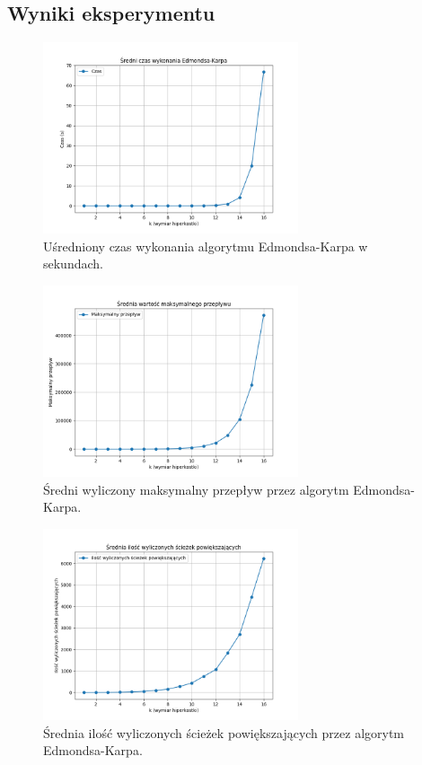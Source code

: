 \documentclass{article}
\begin{document}
\subsection{Wyniki eksperymentu}
\begin{figure}[H]
\centering
\includegraphics[width=0.67\textwidth]{edmondsKarpTimePlot.png}
\caption{Uśredniony czas wykonania algorytmu Edmondsa-Karpa w sekundach.}
\end{figure}

\begin{figure}[H]
\centering
\includegraphics[width=0.67\textwidth]{edmondsKarpFlowPlot.png}
\caption{Średni wyliczony maksymalny przepływ przez algorytm Edmondsa-Karpa.}
\end{figure}

\begin{figure}[H]
\centering
\includegraphics[width=0.67\textwidth]{edmondsKarpPathPlot.png}
\caption{Średnia ilość wyliczonych ścieżek powiększających przez algorytm Edmondsa-Karpa.}
\end{figure}
\end{document}
